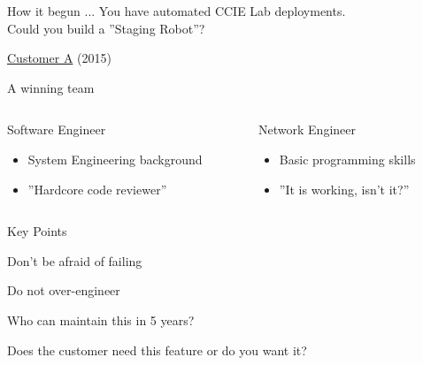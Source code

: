 \documentclass[aspectratio=169]{beamer}
\begin{document}
\begin{frame}{How it begun ...}
  You have automated CCIE Lab deployments. \\ Could you build a ''Staging Robot''?
  \begin{flushright}
    \underline{Customer A} (2015)
  \end{flushright}

\end{frame}

\begin{frame}{A winning team}
  \begin{columns}
    \begin{column}{0.5\textwidth}

      Software Engineer

      \begin{itemize}
        \item System Engineering background
        \item ''Hardcore code reviewer''
      \end{itemize}
    \end{column}
    \begin{column}{0.45\textwidth}
      Network Engineer

      \begin{itemize}
        \item Basic programming skills
        \item ''It is working, isn't it?''
      \end{itemize}
    \end{column}
  \end{columns}

\end{frame}






\begin{frame}{Key Points}

  \begin{vfilleditems}
    \item Don't be afraid of failing
    \item Do not over-engineer
    \item Who can maintain this in 5 years?
    \item Does the customer need this feature or do you want it?
  \end{vfilleditems}



\end{frame}
\end{document}
